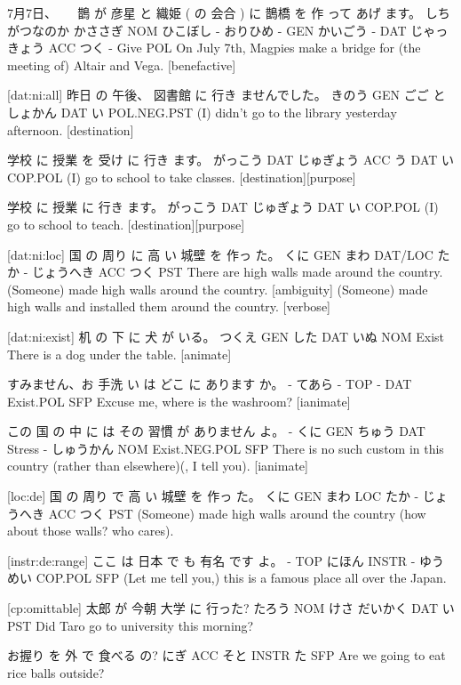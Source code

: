 7月7日、 　     鵲    が   彦星   と  織姫   (  の   会合  )  に   鵲橋       を  作 って あげ ます。
しちがつなのか かささぎ NOM ひこぼし - おりひめ - GEN かいごう - DAT じゃっきょう ACC つく - Give POL
On July 7th, Magpies make a bridge for (the meeting of) Altair and Vega. [benefactive]

[dat:ni:all]
昨日   の  午後、 図書館    に   行き ませんでした。
きのう GEN ごご   としょかん DAT い  POL.NEG.PST
(I) didn't go to the library yesterday afternoon. [destination]

学校    に   授業     を   受け に 行き ます。
がっこう DAT じゅぎょう ACC う  DAT い COP.POL
(I) go to school to take classes. [destination][purpose]

学校    に   授業      に  行き ます。
がっこう DAT じゅぎょう DAT い COP.POL
(I) go to school to teach. [destination][purpose]

[dat:ni:loc]
国   の  周り    に    高  い 城壁      を  作っ た。
くに GEN まわ DAT/LOC たか - じょうへき ACC つく PST
There are high walls made around the country.
(Someone) made high walls around the country. [ambiguity]
(Someone) made high walls and installed them around the country. [verbose]

[dat:ni:exist]
机    の   下  に   犬   が   いる。
つくえ GEN した DAT いぬ NOM Exist
There is a dog under the table. [animate]

すみません、お 手洗 い は どこ に  あります    か。
-          てあら - TOP -  DAT Exist.POL SFP
Excuse me, where is the washroom? [ianimate]

この 国  の   中    に    は  その 習慣     が    ありません    よ。
-  くに GEN ちゅう DAT Stress - しゅうかん NOM Exist.NEG.POL SFP
There is no such custom in this country (rather than elsewhere)(, I tell you). [ianimate]

[loc:de]
国   の  周り  で  高  い 城壁      を  作っ た。
くに GEN まわ LOC たか - じょうへき ACC つく PST
(Someone) made high walls around the country (how about those walls? who cares).

[instr:de:range]
ここ は  日本    で   も  有名    です   よ。
-   TOP にほん INSTR - ゆうめい COP.POL SFP
(Let me tell you,) this is a famous place all over the Japan.

[cp:omittable]
太郎   が  今朝 大学    に   行った?
たろう NOM けさ だいかく DAT い PST
Did Taro go to university this morning?

お握り を   外  で      食べる の?
にぎ   ACC そと INSTR  た SFP
Are we going to eat rice balls outside?
